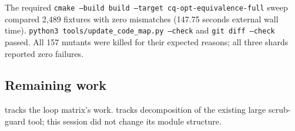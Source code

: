 The required \texttt{cmake --build build --target cq-opt-equivalence-full}
sweep compared 2,489 fixtures with zero mismatches (147.75 seconds external
wall time). \texttt{python3 tools/update\_code\_map.py --check} and
\texttt{git diff --check} passed. All 157 mutants were killed for their expected
reasons; all three shards reported zero failures.

\subsection*{Remaining work}
 tracks the loop matrix's work.
 tracks decomposition of the existing large
scrub-guard tool; this session did not change its module structure.
